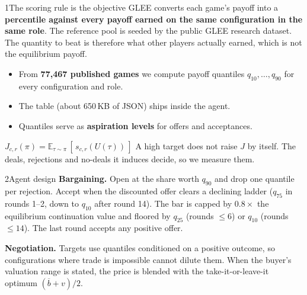 \documentclass[10pt]{article}
\newcommand{\smallsize}{\fontsize{6.9}{8.9}\selectfont}
\newcommand{\lead}[1]{\textbf{\color{navy}#1}}
\begin{document}
{\begin{minipage}[t][295.3mm][t]{207.8mm}
\begin{minipage}[t]{0.485\linewidth}
\begin{panel}{1\quad The scoring rule is the objective}
GLEE converts each game's payoff into a \textbf{percentile against every payoff
earned on the same configuration in the same role}. The reference pool is seeded
by the public GLEE research dataset. The quantity to beat is therefore what
other players actually earned, which is not the equilibrium payoff.
\begin{itemize}
  \item From \textbf{77{,}467 published games} we compute payoff quantiles
        $q_{10},\dots,q_{90}$ for every configuration and role.
  \item The table (about 650\,KB of JSON) ships inside the agent.
  \item Quantiles serve as \textbf{aspiration levels} for offers and acceptances.
\end{itemize}
\begin{tcolorbox}[colback=paper, colframe=paper, arc=1mm, boxrule=0pt,
  left=2mm, right=2mm, top=1.2mm, bottom=1.2mm, before skip=1.6mm, after skip=0mm]\smallsize
$J_{c,r}(\pi)=\mathbb{E}_{\tau\sim\pi}\,[\,s_{c,r}(U(\tau))\,]$\quad
A high target does not raise $J$ by itself. The deals, rejections and no-deals
it induces decide, so we measure them.
\end{tcolorbox}
\end{panel}

\begin{panel}{2\quad Agent design}
\lead{Bargaining.} Open at the share worth $q_{90}$ and drop one quantile per
rejection. Accept when the discounted offer clears a declining ladder ($q_{75}$
in rounds 1--2, down to $q_{10}$ after round 14). The bar is capped by
$0.8\times$ the equilibrium continuation value and floored by $q_{25}$
(rounds $\le 6$) or $q_{10}$ (rounds $\le 14$). The last round accepts any
positive offer.

\vspace{1.3mm}
\lead{Negotiation.} Targets use quantiles conditioned on a positive outcome, so
configurations where trade is impossible cannot dilute them. When the buyer's
valuation range is stated, the price is blended with the take-it-or-leave-it
optimum $(\overline{b}+v)/2$.


\end{panel}
\end{minipage}
\end{minipage}}
\end{document}
